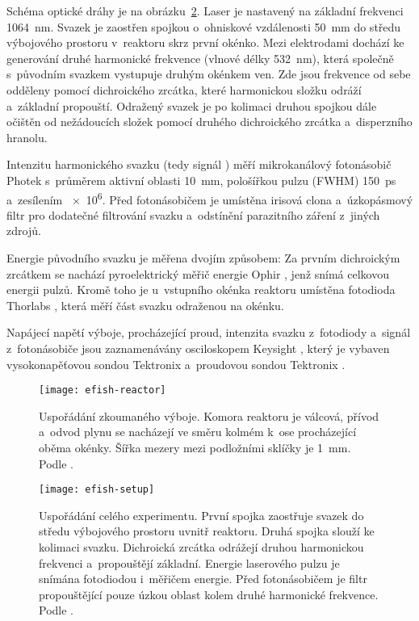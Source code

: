 Schéma optické dráhy je na obrázku~\ref{fig:efish-setup}.
Laser je nastavený na základní frekvenci \SI{1064}{\nano\metre}.
Svazek je zaostřen spojkou o~ohniskové vzdálenosti \SI{50}{\milli\metre}
do středu výbojového prostoru v~reaktoru skrz první okénko.
Mezi elektrodami dochází ke generování druhé harmonické frekvence
(vlnové délky \SI{532}{\nano\metre}), která společně s~původním svazkem
vystupuje druhým okénkem ven.
Zde jsou frekvence od sebe odděleny pomocí dichroického zrcátka,
které harmonickou složku odráží a~základní propouští.
Odražený svazek je po kolimaci druhou spojkou dále očištěn od nežádoucích
složek pomocí druhého dichroického zrcátka a~disperzního hranolu.

Intenzitu harmonického svazku (tedy signál \EFISH{})
měří mikrokanálový fotonásobič
Photek  s~průměrem aktivní oblasti \SI{10}{\milli\metre},
pološířkou pulzu (FWHM) \SI{150}{\pico\second} a~zesílením \num{e6}.
Před fotonásobičem je umístěna irisová clona a~úzkopásmový filtr
pro dodatečné filtrování svazku a~odstínění parazitního záření
z~jiných zdrojů.

Energie původního svazku je měřena dvojím způsobem:
Za prvním dichroickým zrcátkem se nachází pyroelektrický měřič energie
Ophir , jenž snímá celkovou energii pulzů.
Kromě toho je u~vstupního okénka reaktoru umístěna fotodioda
Thorlabs , která měří část svazku odraženou na okénku.

Napájecí napětí výboje, procházející proud, intenzita svazku z~fotodiody
a~signál \EFISH{} z~fotonásobiče jsou zaznamenávány osciloskopem
Keysight ,
který je vybaven vysokonapěťovou sondou Tektronix 
a~proudovou sondou Tektronix .

\begin{figure}
	\texttt{[image: efish-reactor]}
	\caption{Uspořádání zkoumaného výboje.
		Komora reaktoru je válcová, přívod a~odvod plynu se nacházejí
		ve směru kolmém k~ose procházející oběma okénky.
		Šířka mezery mezi podložními sklíčky je \SI{1}{\milli\metre}.
		Podle \cite{efish-nitrogen}.}
	\label{fig:efish-reactor}
\end{figure}

\begin{figure}
	\texttt{[image: efish-setup]}
	\caption{Uspořádání celého experimentu.
	První spojka zaostřuje svazek do středu výbojového prostoru
	uvnitř reaktoru.
	Druhá spojka slouží ke kolimaci svazku.
	Dichroická zrcátka odrážejí druhou harmonickou frekvenci
	a~propouštějí základní.
	Energie laserového pulzu je snímána fotodiodou i~měřičem energie.
	Před fotonásobičem je filtr propouštějící pouze úzkou oblast
	kolem druhé harmonické frekvence.
	Podle \cite{efish-nitrogen}.}
	\label{fig:efish-setup}
\end{figure}

